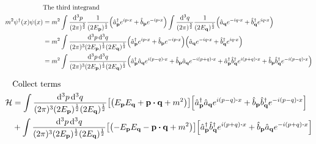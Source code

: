 \documentclass{article}
\begin{document}
\begin{align*}
                              & \qq*{The third integrand}                                                                                                                                                                                                                                                                                                                          \\
    m^2\psi^\dagger(x)\psi(x) & =m^2\int \frac{\dd[3]{p}}{(2\pi)^\frac{3}{2}}  \frac{1}{(2E_{\vb{p}})^{\frac{1}{2}}} \pqty{\hat{a}^\dagger_{\vb{p}}e^{ip\vdot x}+\hat{b}_{\vb{p}}e^{-ip\vdot x}}\int \frac{\dd[3]{q}}{(2\pi)^\frac{3}{2}}  \frac{1}{(2E_{\vb{q}})^{\frac{1}{2}}} \pqty{\hat{a}_{\vb{q}}e^{-iq\vdot x}+\hat{b}^\dagger_{\vb{q}}e^{iq\vdot x}}                       \\
                              & =m^2\int \frac{\dd[3]{p}\dd[3]{q}}{(2\pi)^3(2E_{\vb{p}})^{\frac{1}{2}}(2E_{\vb{q}})^{\frac{1}{2}}}\pqty{\hat{a}^\dagger_{\vb{p}}e^{ip\vdot x}+\hat{b}_{\vb{p}}e^{-ip\vdot x}}\pqty{\hat{a}_{\vb{q}}e^{-iq\vdot x}+\hat{b}^\dagger_{\vb{q}}e^{iq\vdot x}}                                                                                           \\
                              & =m^2\int \frac{\dd[3]{p}\dd[3]{q}}{(2\pi)^3(2E_{\vb{p}})^{\frac{1}{2}}(2E_{\vb{q}})^{\frac{1}{2}}}\pqty{\hat{a}^\dagger_{\vb{p}}\hat{a}_{\vb{q}}e^{i(p-q)\vdot x}+\hat{b}_{\vb{p}}\hat{a}_{\vb{q}}e^{-i(p+q)\vdot x}+\hat{a}^\dagger_{\vb{p}}\hat{b}^\dagger_{\vb{q}}e^{i(p+q)\vdot x}+\hat{b}_{\vb{p}}\hat{b}^\dagger_{\vb{q}}e^{-i(p-q)\vdot x}}
\end{align*}

\begin{align*}
                & \qq*{Collect terms}                                                                                                                                                                                                                                                                 \\
    \mathcal{H} & =\int \frac{\dd[3]{p}\dd[3]{q}}{(2\pi)^3(2E_{\vb{p}})^{\frac{1}{2}}(2E_{\vb{q}})^{\frac{1}{2}}}\bqty{\pqty{E_{\vb{p}}E_{\vb{q}}+\vb{p}\vdot\vb{q}+m^2}}\bqty{\hat{a}^\dagger_{\vb{p}}\hat{a}_{\vb{q}}e^{i(p-q)\vdot x}+\hat{b}_{\vb{p}}\hat{b}^\dagger_{\vb{q}}e^{-i(p-q)\vdot x}}  \\
                & +\int \frac{\dd[3]{p}\dd[3]{q}}{(2\pi)^3(2E_{\vb{p}})^{\frac{1}{2}}(2E_{\vb{q}})^{\frac{1}{2}}}\bqty{\pqty{-E_{\vb{p}}E_{\vb{q}}-\vb{p}\vdot\vb{q}+m^2}}\bqty{\hat{a}^\dagger_{\vb{p}}\hat{b}^\dagger_{\vb{q}}e^{i(p+q)\vdot x}+\hat{b}_{\vb{p}}\hat{a}_{\vb{q}}e^{-i(p+q)\vdot x}} \\
\end{align*}
\end{document}
